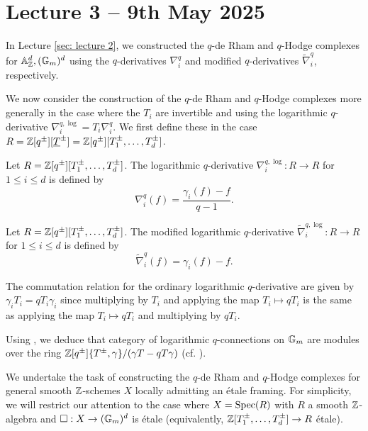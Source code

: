 \section{Lecture 3 -- 9th May 2025}\label{sec: lecture 3}
In Lecture \ref{sec: lecture 2}, we constructed the $q$-de Rham and $q$-Hodge complexes for $\mathbb{A}^{d}_{\mathbb{Z}},(\mathbb{G}_{m})^{d}$ using the $q$-derivatives $\nabla_{i}^{q}$ and modified $q$-derivatives $\widetilde{\nabla}_{i}^{q}$, respectively. 

We now consider the construction of the $q$-de Rham and $q$-Hodge complexes more generally in the case where the $T_{i}$ are invertible and using the logarithmic $q$-derivative $\nabla_{i}^{q,\log}=T_{i}\nabla_{i}^{q}$. We first define these in the case $R=\mathbb{Z}[q^{\pm}][\underline{T}^{\pm}]=\mathbb{Z}[q^{\pm}][T_{1}^{\pm},\dots,T_{d}^{\pm}]$. 
\begin{definition}\label{def: logarithmic q-derivative}
    Let $R=\mathbb{Z}[q^{\pm}][T_{1}^{\pm},\dots,T_{d}^{\pm}]$. The logarithmic $q$-derivative $\nabla_{i}^{q,\log}:R\to R$ for $1\leq i\leq d$ is defined by 
    $$\nabla_{i}^{q}(f)=\frac{\gamma_{i}(f)-f}{q-1}.$$
\end{definition}
\begin{definition}\label{def: modified logarithmic q-derivative}
    Let $R=\mathbb{Z}[q^{\pm}][T_{1}^{\pm},\dots,T_{d}^{\pm}]$. The modified logarithmic $q$-derivative $\widetilde{\nabla}_{i}^{q,\log}:R\to R$ for $1\leq i\leq d$ is defined by 
    $$\widetilde{\nabla}_{i}^{q}(f)=\gamma_{i}(f)-f.$$
\end{definition}
\begin{remark}\label{rmk: commutation for log q-connections}
    The commutation relation for the ordinary logarithmic $q$-derivative are given by $\gamma_{i}T_{i}=qT_{i}\gamma_{i}$ since multiplying by $T_{i}$ and applying the map $T_{i}\mapsto qT_{i}$ is the same as applying the map $T_{i}\mapsto qT_{i}$ and multiplying by $qT_{i}$. 
\end{remark}
\begin{example}
    Using , we deduce that category of logarithmic $q$-connections on $\mathbb{G}_{m}$ are modules over the ring $\mathbb{Z}[q^{\pm}]\{T^{\pm},\gamma\}/(\gamma T-q T\gamma)$ (cf. ). 
\end{example}

We undertake the task of constructing the $q$-de Rham and $q$-Hodge complexes for general smooth $\mathbb{Z}$-schemes $X$ locally admitting an \'{e}tale framing. For simplicity, we will restrict our attention to the case where $X=\operatorname{Spec}(R)$ with $R$ a smooth $\mathbb{Z}$-algebra and $\square:X\to(\mathbb{G}_{m})^{d}$ is \'{e}tale (equivalently, $\mathbb{Z}[T_{1}^{\pm},\dots,T_{d}^{\pm}]\to R$ \'{e}tale). 

